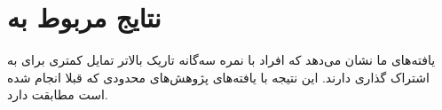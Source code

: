 \section{
  نتایج مربوط به
 }
یافته‌های ما نشان می‌دهد که افراد با نمره سه‌گانه تاریک بالاتر تمایل کمتری برای به اشتراک گذاری دارند.
این نتیجه با یافته‌های پژوهش‌های محدودی که قبلا انجام  شده است مطابقت دارد.

